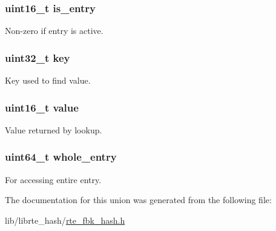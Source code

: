 \subsubsection[{is\+\_\+entry}]{\setlength{\rightskip}{0pt plus 5cm}uint16\+\_\+t is\+\_\+entry}\label{unionrte__fbk__hash__entry_ac6e92ffe3a06cf9cdf87ca3557774f14}
Non-\/zero if entry is active. \hypertarget{unionrte__fbk__hash__entry_a6d4ec8e4f3148d51041635da9986c3fa}{}
\subsubsection[{key}]{\setlength{\rightskip}{0pt plus 5cm}uint32\+\_\+t key}\label{unionrte__fbk__hash__entry_a6d4ec8e4f3148d51041635da9986c3fa}
Key used to find value. \hypertarget{unionrte__fbk__hash__entry_a900b69af7d674b8db3bceae754b4955a}{}
\subsubsection[{value}]{\setlength{\rightskip}{0pt plus 5cm}uint16\+\_\+t value}\label{unionrte__fbk__hash__entry_a900b69af7d674b8db3bceae754b4955a}
Value returned by lookup. \hypertarget{unionrte__fbk__hash__entry_a4d4a628be294f3475bab325721d58073}{}
\subsubsection[{whole\+\_\+entry}]{\setlength{\rightskip}{0pt plus 5cm}uint64\+\_\+t whole\+\_\+entry}\label{unionrte__fbk__hash__entry_a4d4a628be294f3475bab325721d58073}
For accessing entire entry. 

The documentation for this union was generated from the following file\+:\begin{DoxyCompactItemize}
\item 
lib/librte\+\_\+hash/\hyperlink{rte__fbk__hash_8h}{rte\+\_\+fbk\+\_\+hash.\+h}\end{DoxyCompactItemize}
